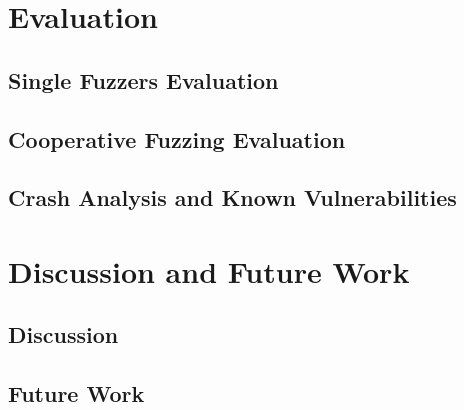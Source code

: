 \documentclass{beamer}
\begin{document}
\section{Evaluation}

\subsection{Single Fuzzers Evaluation}

\subsection{Cooperative Fuzzing Evaluation}

\subsection{Crash Analysis and Known Vulnerabilities}

\section{Discussion and Future Work}

\subsection*{Discussion}

\subsection*{Future Work}
\end{document}

